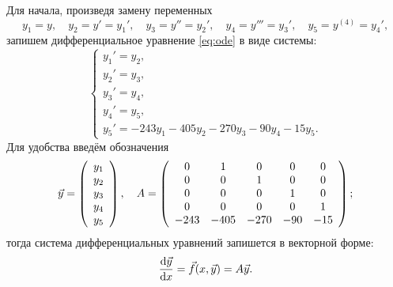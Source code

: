 \documentclass[a4paper,12pt]{article}
\begin{document}
Для начала, произведя замену переменных
\begin{equation*}
    y_1 = y, \quad y_2 = y' = y_1', \quad y_3 = y'' = y_2',
        \quad y_4 = y''' = y_3', \quad y_5 = y^{(4)} = y_4',
\end{equation*}
запишем дифференциальное уравнение \ref{eq:ode} в виде системы:
\begin{equation*}
    \begin{cases}
        y_1' = y_2, \\
        y_2' = y_3, \\
        y_3' = y_4, \\
        y_4' = y_5, \\
        y_5' = -243 y_1 - 405 y_2 - 270 y_3 - 90 y_4 - 15 y_5.
    \end{cases}
\end{equation*}
Для удобства введём обозначения
\begin{equation*}
    \vec{y} =
    \left(
    \begin{array}{c}
        y_1 \\
        y_2 \\
        y_3 \\
        y_4 \\
        y_5
    \end{array}
    \right),
    \quad
    A = 
    \left(
    \begin{array}{c c c c c}
        0 & 1 & 0 & 0 & 0 \\
        0 & 0 & 1 & 0 & 0 \\
        0 & 0 & 0 & 1 & 0 \\
        0 & 0 & 0 & 0 & 1 \\
        -243 & -405 & -270 & -90 & -15
    \end{array}
    \right);
\end{equation*}
тогда система дифференциальных уравнений запишется в векторной форме:
\begin{equation*}
    \dv{\vec{y}}{x} = \vec{f}(x, \vec{y}) = A \vec{y}.
\end{equation*}
\end{document}
